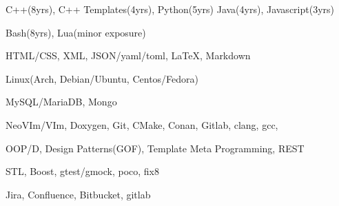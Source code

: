 {C++(8yrs), C++ Templates(4yrs), Python(5yrs) Java(4yrs), Javascript(3yrs)}

{Bash(8yrs), Lua(minor exposure)}

{HTML/CSS, XML, JSON/yaml/toml, {\LaTeX}, Markdown }

{Linux(Arch, Debian/Ubuntu, Centos/Fedora)}

{MySQL/MariaDB, Mongo}

{NeoVIm/VIm, Doxygen, Git, CMake, Conan, Gitlab, clang, gcc, }

{OOP/D, Design Patterns(GOF), Template Meta Programming, REST}

{STL, Boost, gtest/gmock, poco, fix8}

{Jira, Confluence, Bitbucket, gitlab}
